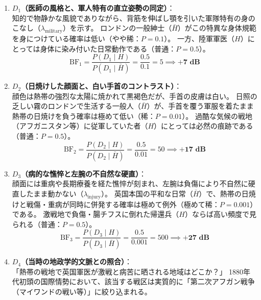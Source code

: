 \begin{enumerate}[label=\textbf{(\arabic*)}]
  \item \textbf{$D_1$（医師の風格と、軍人特有の直立姿勢の同定）}：\\
  知的で物静かな風貌でありながら、背筋を伸ばし顎を引いた軍隊特有の身のこなし（$\lambda_{\mathrm{military}}$）を示す。
  ロンドンの一般紳士（$\bar{H}$）がこの特異な身体規範を身につけている確率は低い（やや稀：$P=0.1$）。
  一方、陸軍軍医（$H$）にとっては身体に染み付いた日常動作である（普通：$P=0.5$）。
  \begin{equation}
    \mathrm{BF}_1 = \frac{P(D_1 \mid H)}{P(D_1 \mid \bar{H})} = \frac{0.5}{0.1} = 5 \implies \mathbf{+7\text{ dB}}
  \end{equation}

  \item \textbf{$D_2$（日焼けした顔面と、白い手首のコントラスト）}：\\
  顔色は熱帯の強烈な太陽に焼かれて黒褐色だが、手首の皮膚は白い。
  日照の乏しい霧のロンドンで生活する一般人（$\bar{H}$）が、手首を覆う軍服を着たまま熱帯の日焼けを負う確率は極めて低い（稀：$P=0.01$）。
  過酷な気候の戦地（アフガニスタン等）に従軍していた者（$H$）にとっては必然の痕跡である（普通：$P=0.5$）。
  \begin{equation}
    \mathrm{BF}_2 = \frac{P(D_2 \mid H)}{P(D_2 \mid \bar{H})} = \frac{0.5}{0.01} = 50 \implies \mathbf{+17\text{ dB}}
  \end{equation}

  \item \textbf{$D_3$（病的な憔悴と左腕の不自然な硬直）}：\\
  顔面には重病や長期療養を経た憔悴が刻まれ、左腕は負傷により不自然に硬直したまま動かない（$\lambda_{\mathrm{injury}}$）。
  英国本国の平和な日常（$\bar{H}$）で、熱帯の日焼けと戦傷・重病が同時に併発する確率は極めて例外（極めて稀：$P=0.001$）である。
  激戦地で負傷・腸チフスに倒れた帰還兵（$H$）ならば高い頻度で見られる（普通：$P=0.5$）。
  \begin{equation}
    \mathrm{BF}_3 = \frac{P(D_3 \mid H)}{P(D_3 \mid \bar{H})} = \frac{0.5}{0.001} = 500 \implies \mathbf{+27\text{ dB}}
  \end{equation}

  \item \textbf{$D_4$（当時の地政学的文脈との照合）}：\\
  「熱帯の戦地で英国軍医が激戦と病苦に晒される地域はどこか？」
  1880年代初頭の国際情勢において、該当する戦区は実質的に「第二次アフガン戦争（マイワンドの戦い等）」に絞り込まれる。
\end{enumerate}

